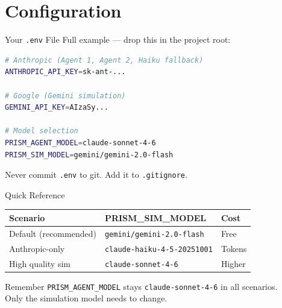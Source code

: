 \documentclass{beamer}
\begin{document}
\section{Configuration}

\begin{frame}[fragile]{Your \texttt{.env} File}
  Full example — drop this in the project root:
\begin{lstlisting}[language=bash]
# Anthropic (Agent 1, Agent 2, Haiku fallback)
ANTHROPIC_API_KEY=sk-ant-...

# Google (Gemini simulation)
GEMINI_API_KEY=AIzaSy...

# Model selection
PRISM_AGENT_MODEL=claude-sonnet-4-6
PRISM_SIM_MODEL=gemini/gemini-2.0-flash
\end{lstlisting}
  \vspace{6pt}
  \alert{Never commit \texttt{.env} to git.} Add it to \texttt{.gitignore}.
\end{frame}

\begin{frame}{Quick Reference}
  \centering
  \begin{tabular}{lll}
    \hline
    \textbf{Scenario} & \textbf{PRISM\_SIM\_MODEL} & \textbf{Cost} \\
    \hline
    Default (recommended) & \texttt{gemini/gemini-2.0-flash} & Free \\
    Anthropic-only & \texttt{claude-haiku-4-5-20251001} & Tokens \\
    High quality sim & \texttt{claude-sonnet-4-6} & Higher \\
    \hline
  \end{tabular}
  \vspace{14pt}
  \begin{block}{Remember}
    \texttt{PRISM\_AGENT\_MODEL} stays \texttt{claude-sonnet-4-6} in all scenarios.\\
    Only the simulation model needs to change.
  \end{block}
\end{frame}
\end{document}
